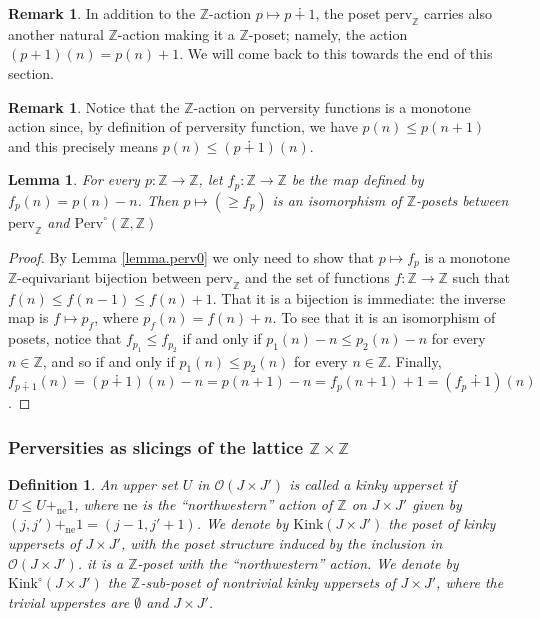 \documentclass{article}
\newtheorem{lem}[thm]{Lemma}
\newtheorem{defn}[thm]{Definition}
\theoremstyle{definition}
\newtheorem{rem}[thm]{Remark}
\newcommand{\Z}{\mathbb{Z}}
\newcommand{\Oo}{\mathcal{O}}
\begin{document}
\begin{rem}\label{other-action}
In addition to the $\Z$-action $p\mapsto p\dotplus 1$, the poset  $\mathrm{perv}_\Z$ carries also another natural $\Z$-action making it a $\Z$-poset; namely, the action $(p+1)(n)=p(n)+1$. We will come back to this towards the end of this section.
\end{rem}

\begin{rem}
Notice that the $\Z$-action on perversity functions is a monotone action since, by definition of perversity function, we have $p(n)\leq p(n+1)$ and this precisely means $p(n)\leq (p\dotplus1)(n)$.
\end{rem}
\begin{lem}
For every $p\colon \Z \to \Z$, let $f_p\colon \Z\to \Z$ be the map defined by $f_p(n)= p(n)-n$. Then $p\mapsto (\geq f_p)$ is an isomorphism of $\Z$-posets between $\mathrm{perv}_\Z$ and $\mathrm{Perv}^\circ(\Z,\Z)$
\end{lem}
\begin{proof}
By Lemma \ref{lemma.perv0} we only need to show that $p\mapsto f_p$ is a monotone $\Z$-equivariant bijection between  $\mathrm{perv}_\Z$ and the set of functions $f\colon \Z\to \Z$ such that $f(n)\leq f(n-1)\leq f(n)+1$. That it is a bijection is immediate: the inverse map is $f\mapsto p_f$, where $p_f(n)=f(n)+n$. To see that it is an isomorphism of posets, notice that $f_{p_1}\leq f_{p_2}$ if and only if $p_1(n)-n\leq p_2(n)-n$ for every $n\in \Z$, and so if and only if $p_1(n)\leq p_2(n)$ for every $n\in \Z$. Finally, $f_{p\dotplus1}(n)=(p\dotplus 1)(n)-n=p(n+1)-n=f_p(n+1)+1=(f_p\dotplus 1)(n)$.
\end{proof}

\subsubsection{Perversities as slicings of the lattice $\Z\times \Z$}

\begin{defn}
An upper set $U$ in $\Oo(J\times J')$ is called a \emph{kinky upperset} if $U\leq U+_\mathrm{ne}1$, where ${\mathrm{ne}}$ is the ``northwestern'' action of $\Z$ on $J\times J'$ given by
$(j,j')+_{\mathrm{ne}}1=(j-1,j'+1)$. We denote by $\mathrm{Kink}(J\times J')$ the poset of kinky uppersets of $J\times J'$, with the poset structure induced by the inclusion in $\Oo(J\times J')$. it is a $\Z$-poset with the ``northwestern'' action. We denote by $\mathrm{Kink}^\circ(J\times J')$ the $\Z$-sub-poset of nontrivial kinky uppersets of $J\times J'$, where 
the trivial upperstes are $\emptyset$ and $J\times J'$.
\end{defn}
\end{document}

